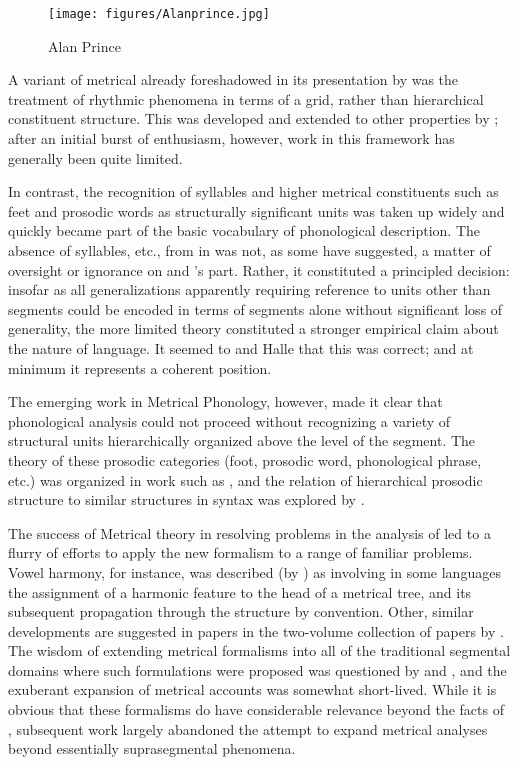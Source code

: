 \begin{wrapfigure}{r}{.35\textwidth}
  \texttt{[image: figures/Alanprince.jpg]}
  \caption{Alan Prince}
  \label{fig:ch.otlabphon.prince}
\end{wrapfigure}
A variant of metrical  already foreshadowed in its
presentation by \citet{liberman:prince:stress} was the treatment of
rhythmic phenomena in terms of a grid, rather than hierarchical
constituent structure. This was developed and extended to other
properties by \citet{prince:grids}; after an initial burst of
enthusiasm, however, work in this framework has generally been quite
limited.

In {contrast}, the recognition of syllables and higher metrical
constituents such as feet and prosodic words as structurally
significant units was taken up widely and quickly became part of the
basic vocabulary of phonological description. The absence of
syllables, etc., from  in \textsl{} was
not, as some have suggested, a matter of oversight or ignorance on
{\Chomsky} and {\Halle}'s part. Rather, it constituted a principled
decision: insofar as all generalizations apparently requiring
reference to units other than segments could be encoded in terms of
segments alone without significant loss of generality, the more
limited theory constituted a stronger empirical claim about the nature
of language. It seemed to {\Chomsky} and Halle that this was correct; and
at minimum it represents a coherent position.

The emerging work in Metrical Phonology, however, made it clear that
phonological analysis could not proceed without recognizing a variety
of structural units hierarchically organized above the level of the
segment.  The theory of these prosodic categories (foot, prosodic
word, phonological phrase, etc.) was organized in work such as
\citet{nespor:vogel:prosodic:phon}, and the relation of hierarchical
prosodic structure to similar structures in syntax was explored by
\citet{selkirk84:book}.

The success of Metrical theory in resolving problems in the analysis
of  led to a flurry of efforts to apply the new formalism to a
range of familiar problems. Vowel harmony, for instance, was described
(by \citealt{halle.vergnaud81:harmony}) as involving in some languages
the assignment of a harmonic feature to the head of a metrical tree,
and its subsequent propagation through the structure by
convention. Other, similar developments are suggested in papers in the
two-volume collection of papers by
\citet{struct_phon_rep_I,struct_phon_rep_II}. The wisdom of extending
metrical formalisms into all of the traditional segmental domains
where such formulations were proposed was questioned by
\citet{sra:ruletypes} and \citet{poser:distance}, and the exuberant
expansion of metrical accounts was somewhat short-lived. While it is
obvious that these formalisms do have considerable relevance beyond
the facts of , subsequent work largely abandoned the attempt to
expand metrical analyses beyond essentially suprasegmental phenomena.

